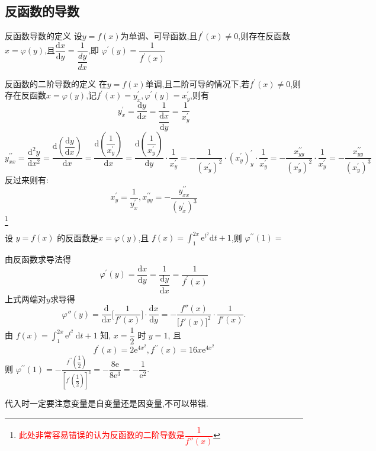 \documentclass[8pt a4paper, oneside, UTF8]{ctexbook}  %
\begin{document}
\begin{sloppypar}
    \subsection{反函数的导数}
    \begin{defn}{反函数导数的定义}{}
        设$y=f(x)$为单调、可导函数,且$f^{\prime}(x)\neq0$,则存在反函数$x=\varphi(y)$,且$\dfrac{\mathrm{d}x}{\mathrm{d}y}=\dfrac{1}{\dfrac{dy}{dx}}$,即 $\varphi^{\prime}(y)=\dfrac1{f^{\prime}(x)}$
    \end{defn}
    \begin{defn}{反函数的二阶导数的定义}{}
        在$y=f(x)$单调,且二阶可导的情况下,若$f^{\prime}(x)\neq0$,则存在反函数$x=\varphi(y)$,记$f^{\prime}(x)=y_x^{\prime},\varphi^{\prime}\left(y\right)=x_{y}^{\prime}$,则有
        $$
            y_{x}^{\prime}=\dfrac{\mathrm{d}y}{\mathrm{d}x}=\dfrac{1}{\dfrac{\mathrm{d}x}{\mathrm{d}y}}=\frac{1}{x_{y}^{\prime}}
        $$
        $$
            y_{xx}^{\prime\prime}=\dfrac{\mathrm{d}^{2}y}{\mathrm{d}x^{2}}=\dfrac{\mathrm{d}\left(\dfrac{\mathrm{d}y}{\mathrm{d}x}\right)}{\mathrm{d}x}=\dfrac{\mathrm{d}\left(\dfrac{1}{x_{y}^{\prime}}\right)}{\mathrm{d}x}=\dfrac{\mathrm{d}\left(\dfrac{1}{x_{y}^{\prime}}\right)}{\mathrm{d}y}\cdot\dfrac{1}{x_{y}^{\prime}}=-\dfrac{1}{(x_{y}^{\prime})^{2}}\cdot(x_{y}^{\prime})_{y}^{\prime}\cdot\dfrac{1}{x_{y}^{\prime}}=-\dfrac{x_{yy}^{\prime\prime}}{(x_{y}^{\prime})^{2}}\cdot\dfrac{1}{x_{y}^{\prime}}=-\dfrac{x_{yy}^{\prime\prime}}{(x_{y}^{\prime})^{3}}
        $$
        反过来则有:
        $$
            x_{y}^{\prime}=\dfrac{1}{y_{x}^{\prime}},x_{yy}^{\prime\prime}=-\dfrac{y_{xx}^{\prime\prime}}{(y_{x}^{\prime})^{3}}
        $$\footnote{\textcolor{red}{此处非常容易错误的认为反函数的二阶导数是$\dfrac{1}{f''(x)}$}}
    \end{defn}
    \begin{problem}
    设 $y=f(x)$ 的反函数是$x=\varphi(y)$,且 $f(x)=\int_1^{2x}\mathrm{e}^{t^2}\mathrm{d}t+1$,则 $\varphi^{\prime\prime}(1)=$
    \end{problem}
    \begin{solution}
        由反函数求导法得
        $$
            \varphi^{'}(y)=\frac{\mathrm{d}x}{\mathrm{d}y}=\dfrac{1}{\dfrac{\mathrm{d}y}{\mathrm{d}x}}=\frac{1}{f^{'}(x)}
        $$
        上式两端对$y$求导得
        $$
            \varphi''(y)=\frac{\mathrm{d}}{\mathrm{d}x}\biggl[\frac{1}{f'(x)}\biggr]\cdot\frac{\mathrm{d}x}{\mathrm{d}y}=-\frac{f''(x)}{\bigl[f'(x)\bigr]^2}\cdot\frac{1}{f'(x)}.
        $$
        由 $f(x)=\int_1^{2 x} \mathrm{e}^{t^2} \mathrm{~d} t+1$ 知, $x=\dfrac{1}{2}$ 时 $y=1$, 且
        $$
            f^{\prime}(x)=2 \mathrm{e}^{4 x^2}, f^{\prime \prime}(x)=16 x \mathrm{e}^{4 x^2}
        $$
        则 $\varphi^{\prime \prime}(1)=-\frac{f^{\prime \prime}\left(\dfrac{1}{2}\right)}{\left[f^{\prime}\left(\dfrac{1}{2}\right)\right]^3}=-\dfrac{8 \mathrm{e}}{8 \mathrm{e}^3}=-\dfrac{1}{\mathrm{e}^2}$.
    \end{solution}
    \begin{note}
        代入时一定要注意变量是自变量还是因变量,不可以带错.
    \end{note}

\end{sloppypar}
\end{document}
